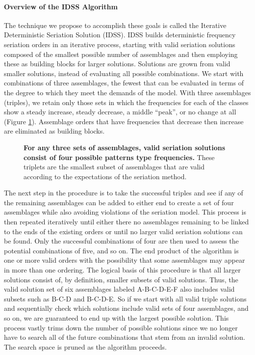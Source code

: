 \documentclass[10pt,letterpaper]{article}
\begin{document}
\paragraph{Overview of the IDSS Algorithm}
The technique we propose to accomplish these goals is called the Iterative Deterministic Seriation Solution (IDSS). IDSS builds deterministic frequency seriation orders in an iterative process, starting with valid seriation solutions composed of the smallest possible number of assemblages and then employing these as building blocks for larger solutions. Solutions are grown from valid smaller solutions, instead of evaluating all possible combinations. We start with combinations of three assemblages, the fewest that can be evaluated in terms of the degree to which they meet the demands of the model. With three assemblages (triples), we retain only those sets in which the frequencies for each of the classes show a steady increase, steady decrease, a middle ``peak'', or no change at all (Figure \ref{fig3}). Assemblage orders that have frequencies that decrease then increase are eliminated as building blocks. 

\begin{figure}[h]
\caption{{\bf For any three sets of assemblages, valid seriation solutions consist of four possible patterns type frequencies.} These triplets are the smallest subset of assemblages that are valid according to the expectations of the seriation method.}
\label{fig3}
\end{figure}

The next step in the procedure is to take the successful triples and see if any of the remaining assemblages can be added to either end to create a set of four assemblages while also avoiding violations of the seriation model. This process is then repeated iteratively until either there no assemblages remaining to be linked to the ends of the existing orders or until no larger valid seriation solutions can be found. Only the successful combinations of four are then used to assess the potential combinations of five, and so on. The end product of the algorithm is one or more valid orders with the possibility that some assemblages may appear in more than one ordering. 
The logical basis of this procedure is that all larger solutions consist of, by definition, smaller subsets of valid solutions. Thus, the valid solution set of six assemblages labeled A-B-C-D-E-F also includes valid subsets such as B-C-D and B-C-D-E. So if we start with all valid triple solutions and sequentially check which solutions include valid sets of four assemblages, and so on, we are guaranteed to end up with the largest possible solution. This process vastly trims down the number of possible solutions since we no longer have to search all of the future combinations that stem from an invalid solution. The search space is pruned as the algorithm proceeds. 
\end{document}
